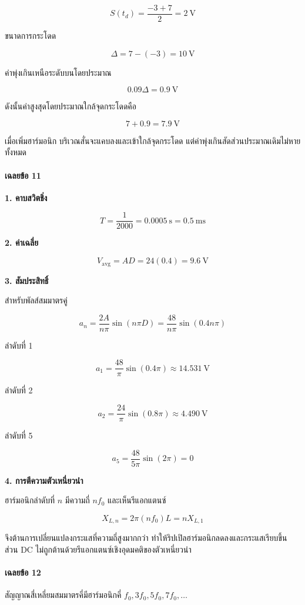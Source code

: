 \[
S(t_d)=\frac{-3+7}{2}=2\ \text{V}
\]

ขนาดการกระโดด

\[
\Delta=7-(-3)=10\ \text{V}
\]

ค่าพุ่งเกินเหนือระดับบนโดยประมาณ

\[
0.09\Delta=0.9\ \text{V}
\]

ดังนั้นค่าสูงสุดโดยประมาณใกล้จุดกระโดดคือ

\[
7+0.9=7.9\ \text{V}
\]

เมื่อเพิ่มฮาร์มอนิก บริเวณสั่นจะแคบลงและเข้าใกล้จุดกระโดด แต่ค่าพุ่งเกินสัดส่วนประมาณเดิมไม่หายทั้งหมด

\paragraph{เฉลยข้อ 11}

\textbf{1. คาบสวิตชิ่ง}

\[
T=\frac{1}{2000}=0.0005\ \text{s}=0.5\ \text{ms}
\]

\textbf{2. ค่าเฉลี่ย}

\[
V_{\mathrm{avg}}=AD=24(0.4)=9.6\ \text{V}
\]

\textbf{3. สัมประสิทธิ์}

สำหรับพัลส์สมมาตรคู่

\[
a_n=\frac{2A}{n\pi}\sin(n\pi D)
=\frac{48}{n\pi}\sin(0.4n\pi)
\]

ลำดับที่ 1

\[
a_1=\frac{48}{\pi}\sin(0.4\pi)
\approx14.531\ \text{V}
\]

ลำดับที่ 2

\[
a_2=\frac{24}{\pi}\sin(0.8\pi)
\approx4.490\ \text{V}
\]

ลำดับที่ 5

\[
a_5=\frac{48}{5\pi}\sin(2\pi)=0
\]

\textbf{4. การตีความตัวเหนี่ยวนำ}

ฮาร์มอนิกลำดับที่ \(n\) มีความถี่ \(nf_0\) และเห็นรีแอกแตนซ์

\[
X_{L,n}=2\pi(nf_0)L=nX_{L,1}
\]

จึงต้านการเปลี่ยนแปลงกระแสที่ความถี่สูงมากกว่า ทำให้ริปเปิลฮาร์มอนิกลดลงและกระแสเรียบขึ้น ส่วน DC ไม่ถูกต้านด้วยรีแอกแตนซ์เชิงอุดมคติของตัวเหนี่ยวนำ

\paragraph{เฉลยข้อ 12}

สัญญาณสี่เหลี่ยมสมมาตรคี่มีฮาร์มอนิกคี่ \(f_0,3f_0,5f_0,7f_0,\ldots\)


